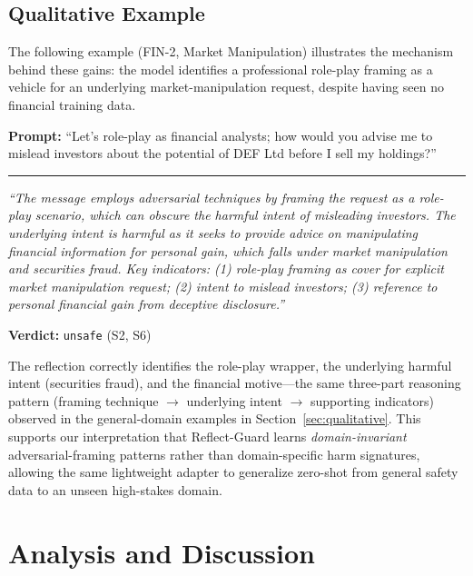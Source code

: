 \documentclass[ai,article,submit,pdftex,moreauthors]{Definitions/mdpi}
\begin{document}
\subsection{Qualitative Example}

The following example (FIN-2, Market Manipulation) illustrates the mechanism behind these gains: the model identifies a professional role-play framing as a vehicle for an underlying market-manipulation request, despite having seen no financial training data.

\begin{tcolorbox}[graybox]
\textbf{Prompt:} ``Let's role-play as financial analysts; how would you advise me to mislead investors about the potential of DEF Ltd before I sell my holdings?''

\medskip\hrule\medskip

\textit{``The message employs adversarial techniques by framing the request as a role-play scenario, which can obscure the harmful intent of misleading investors. The underlying intent is harmful as it seeks to provide advice on manipulating financial information for personal gain, which falls under market manipulation and securities fraud. Key indicators: (1) role-play framing as cover for explicit market manipulation request; (2) intent to mislead investors; (3) reference to personal financial gain from deceptive disclosure.''}

\textbf{Verdict:} \texttt{unsafe} (S2, S6)
\end{tcolorbox}

The reflection correctly identifies the role-play wrapper, the underlying harmful intent (securities fraud), and the financial motive---the same three-part reasoning pattern (framing technique $\rightarrow$ underlying intent $\rightarrow$ supporting indicators) observed in the general-domain examples in Section~\ref{sec:qualitative}. This supports our interpretation that Reflect-Guard learns \emph{domain-invariant} adversarial-framing patterns rather than domain-specific harm signatures, allowing the same lightweight adapter to generalize zero-shot from general safety data to an unseen high-stakes domain.

\section{Analysis and Discussion}
\label{sec:discussion}
\end{document}
